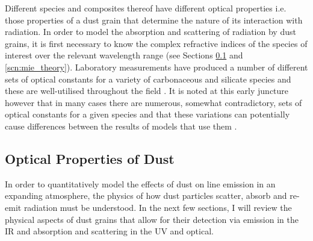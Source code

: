 Different species and composites thereof have different optical properties i.e. those properties of a dust grain that determine the nature of its interaction with radiation.  In order to model the absorption and scattering of radiation by dust grains, it is first necessary to know the complex refractive indices of the species of interest over the relevant wavelength range (see Sections \ref{opt_prop} and \ref{scn:mie_theory}).  Laboratory measurements have produced a number of different sets of optical constants for a variety of carbonaceous and silicate species and these are well-utilised throughout the field \citep{Draine1984,Zubko1996,Jager2003}.  It is noted at this early juncture however that in many cases there are numerous, somewhat contradictory, sets of optical constants for a given species and that these variations can potentially cause differences between the results of models that use them \citep{Owen2015}.  
%



\subsection{Optical Properties of Dust}
\label{opt_prop}


In order to quantitatively model the effects of dust on line emission in an expanding atmosphere, the physics of how dust particles scatter, absorb and re-emit radiation must be understood. In the next few sections, I will review the physical aspects of dust grains that allow for their detection via emission in the IR and absorption and scattering in the UV and optical.   


